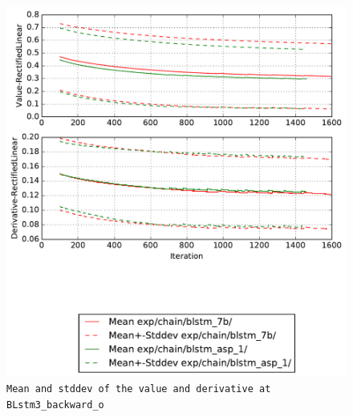 \documentclass[prl,10pt,twocolumn]{revtex4}
\begin{document}
\newpage
\begin{figure}[h]
  \begin{center}
    \caption{\texttt{Mean and stddev of the value and derivative at BLstm3\_backward\_o}}
    \includegraphics[width=\textwidth]{exp/chain/blstm_7b/report/nonlinstats_BLstm3_backward_o.pdf}
  \end{center}
\end{figure}
\clearpage
\end{document}
